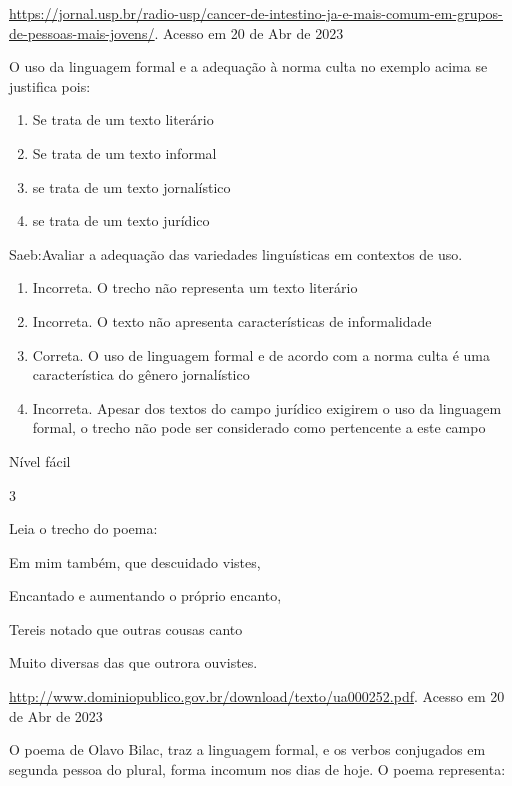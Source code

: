 {{\begin{escolha}
{\begin{itemize}
\begin{itemize}
\href{https://jornal.usp.br/radio-usp/cancer-de-intestino-ja-e-mais-comum-em-grupos-de-pessoas-mais-jovens/}{\uline{https://jornal.usp.br/radio-usp/cancer-de-intestino-ja-e-mais-comum-em-grupos-de-pessoas-mais-jovens/}}.
Acesso em 20 de Abr de 2023

O uso da linguagem formal e a adequação à norma culta no exemplo acima
se justifica pois:

\begin{enumerate}
\def\labelenumi{\alph{enumi})}
\item
  Se trata de um texto literário
\item
  Se trata de um texto informal
\item
  se trata de um texto jornalístico
\item
  se trata de um texto jurídico
\end{enumerate}

Saeb:Avaliar a adequação das variedades linguísticas em contextos de
uso.

\begin{enumerate}
\def\labelenumi{\arabic{enumi}.}
\item
  Incorreta. O trecho não representa um texto literário
\item
  Incorreta. O texto não apresenta características de informalidade
\item
  Correta. O uso de linguagem formal e de acordo com a norma culta é uma
  característica do gênero jornalístico
\item
  Incorreta. Apesar dos textos do campo jurídico exigirem o uso da
  linguagem formal, o trecho não pode ser considerado como pertencente a
  este campo
\end{enumerate}

Nível fácil

\num{3}

Leia o trecho do poema:

Em mim também, que descuidado vistes,

Encantado e aumentando o próprio encanto,

Tereis notado que outras cousas canto

Muito diversas das que outrora ouvistes.

\href{http://www.dominiopublico.gov.br/download/texto/ua000252.pdf}{\uline{http://www.dominiopublico.gov.br/download/texto/ua000252.pdf}}.
Acesso em 20 de Abr de 2023

O poema de Olavo Bilac, traz a linguagem formal, e os verbos conjugados
em segunda pessoa do plural, forma incomum nos dias de hoje. O poema
representa:


\end{itemize}
\end{itemize}}
\end{escolha}}}
